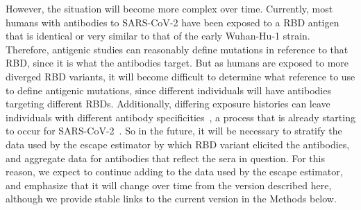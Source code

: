 \documentclass[9pt,twocolumn,twoside]{gsajnl_modified}
\begin{document}
However, the situation will become more complex over time.
Currently, most humans with antibodies to SARS-CoV-2 have been exposed to a RBD antigen that is identical or very similar to that of the early Wuhan-Hu-1 strain.
Therefore, antigenic studies can reasonably define mutations in reference to that RBD, since it is what the antibodies target.
But as humans are exposed to more diverged RBD variants, it will become difficult to determine what reference to use to define antigenic mutations, since different individuals will have antibodies targeting different RBDs.
Additionally, differing exposure histories can leave individuals with different antibody specificities~\citep{cobey2017immune}, a process that is already starting to occur for SARS-CoV-2~\citep{greaney2021sars}.
So in the future, it will be necessary to stratify the data used by the escape estimator by which RBD variant elicited the antibodies, and aggregate data for antibodies that reflect the sera in question.
For this reason, we expect to continue adding to the data used by the escape estimator, and emphasize that it will change over time from the version described here, although we provide stable links to the current version in the Methods below. 
\end{document}
